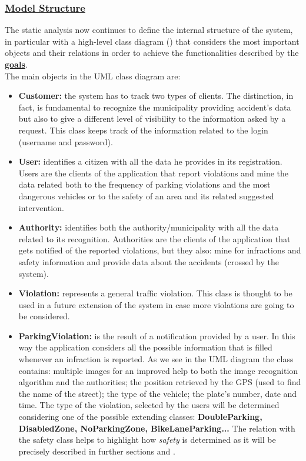 	\subsubsection[Model Structure]{\hyperlink{toc}{Model Structure}}
	The static analysis now continues to define the internal structure of the system, in particular with a high-level class diagram () that considers the most important objects and their relations in order to achieve the functionalities described by the \hyperref[sec:goals]{\textbf{goals}}.\\
	
	The main objects in the UML class diagram are:
	\begin{itemize}
		\item \textbf{Customer:} the system has to track two types of clients. The distinction, in fact, is fundamental to recognize the municipality providing accident's data but also to give a different level of visibility to the information asked by a request. This class keeps track of the information related to the login (username and password).
		
		\item \textbf{User:} identifies a citizen with all the data he provides in its registration. Users are the clients of the application that report violations and mine the data related both to the frequency of parking violations and the most dangerous vehicles or to the safety of an area and its related suggested intervention.
		
		\item \textbf{Authority:} identifies both the authority/municipality with all the data related to its recognition. Authorities are the clients of the application that gets notified of the reported violations, but they also: mine for infractions and safety information and provide data about the accidents (crossed by the system).
		
		\item \textbf{Violation:} represents a general traffic violation. This class is thought to be used in a future extension of the system in case more violations are going to be considered.
		
		\item \textbf{ParkingViolation:} is the result of a notification provided by a user. In this way the application considers all the possible information that is filled whenever an infraction is reported. As we see in the UML diagram the class contains: multiple images for an improved help to both the image recognition algorithm and the authorities; the position retrieved by the GPS (used to find the name of the street); the type of the vehicle; the plate's number, date and time. The type of the violation, selected by the users will be determined considering one of the possible extending classes: \textbf{DoubleParking, DisabledZone, NoParkingZone, BikeLaneParking...} The relation with the safety class helps to highlight how \emph{safety} is determined as it will be precisely described in further sections  and .
		

\end{itemize}
